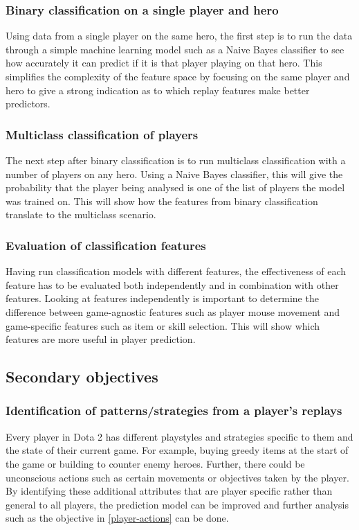 \documentclass{sty/SizheArticle}
\newcommand{\dota}{Dota 2}
\begin{document}
\subsubsection{Binary classification on a single player and hero}
Using data from a single player on the same hero, the first step is to run the data through a simple machine learning model such as a Naive Bayes classifier to see how accurately it can predict if it is that player playing on that hero. This simplifies the complexity of the feature space by focusing on the same player and hero to give a strong indication as to which replay features make better predictors.  

\subsubsection{Multiclass classification of players}
The next step after binary classification is to run multiclass classification with a number of players on any hero. Using a Naive Bayes classifier, this will give the probability that the player being analysed is one of the list of players the model was trained on. This will show how the features from binary classification translate to the multiclass scenario. 

\subsubsection{Evaluation of classification features}
Having run classification models with different features, the effectiveness of each feature has to be evaluated both independently and in combination with other features. Looking at features independently is important to determine the difference between game-agnostic features such as player mouse movement and game-specific features such as item or skill selection. This will show which features are more useful in player prediction. 

\subsection{Secondary objectives}

\subsubsection{Identification of patterns/strategies from a player's replays}
Every player in \dota{} has different playstyles and strategies specific to them and the state of their current game. For example, buying greedy items at the start of the game or building to counter enemy heroes. Further, there could be unconscious actions such as certain movements or objectives taken by the player. By identifying these additional attributes that are player specific rather than general to all players, the prediction model can be improved and further analysis such as the objective in \ref{player-actions} can be done.
\end{document}
